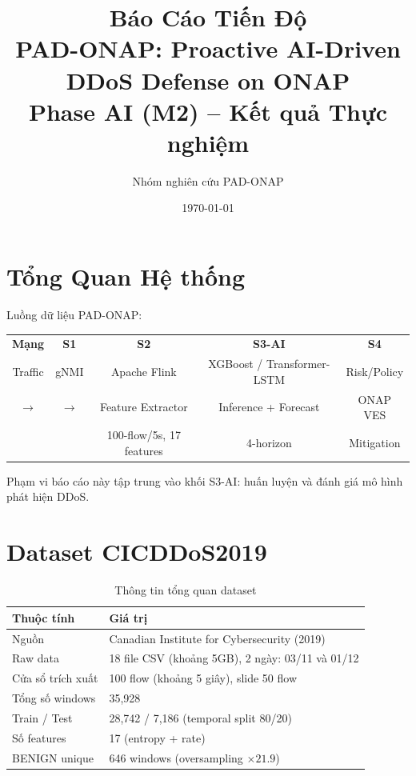 \documentclass[12pt,a4paper]{article}
\title{Báo Cáo Tiến Độ\\
\large PAD-ONAP: Proactive AI-Driven DDoS Defense on ONAP\\
\normalsize Phase AI (M2) -- Kết quả Thực nghiệm}
\author{Nhóm nghiên cứu PAD-ONAP}
\date{\today}
\begin{document}
\maketitle
\tableofcontents
\newpage

\section{Tổng Quan Hệ thống}

Luồng dữ liệu PAD-ONAP:

\begin{center}
\begin{tabular}{c c c c c}
\textbf{Mạng} & \textbf{S1} & \textbf{S2} & \textbf{S3-AI} & \textbf{S4} \\
Traffic & gNMI & Apache Flink & XGBoost / Transformer-LSTM & Risk/Policy \\
$\rightarrow$ & $\rightarrow$ & Feature Extractor & Inference + Forecast & ONAP VES \\
 &  & 100-flow/5s, 17 features & 4-horizon & Mitigation
\end{tabular}
\end{center}

Phạm vi báo cáo này tập trung vào khối S3-AI: huấn luyện và đánh giá mô hình phát hiện DDoS.

\section{Dataset CICDDoS2019}

\begin{table}[H]
\centering
\caption{Thông tin tổng quan dataset}
\begin{tabular}{>{\raggedright\arraybackslash}p{5cm} p{9cm}}
\toprule
\textbf{Thuộc tính} & \textbf{Giá trị} \\
\midrule
Nguồn & Canadian Institute for Cybersecurity (2019) \\
Raw data & 18 file CSV (khoảng 5GB), 2 ngày: 03/11 và 01/12 \\
Cửa sổ trích xuất & 100 flow (khoảng 5 giây), slide 50 flow \\
Tổng số windows & 35,928 \\
Train / Test & 28,742 / 7,186 (temporal split 80/20) \\
Số features & 17 (entropy + rate) \\
BENIGN unique & 646 windows (oversampling $\times 21.9$) \\
\bottomrule
\end{tabular}
\end{table}
\end{document}
